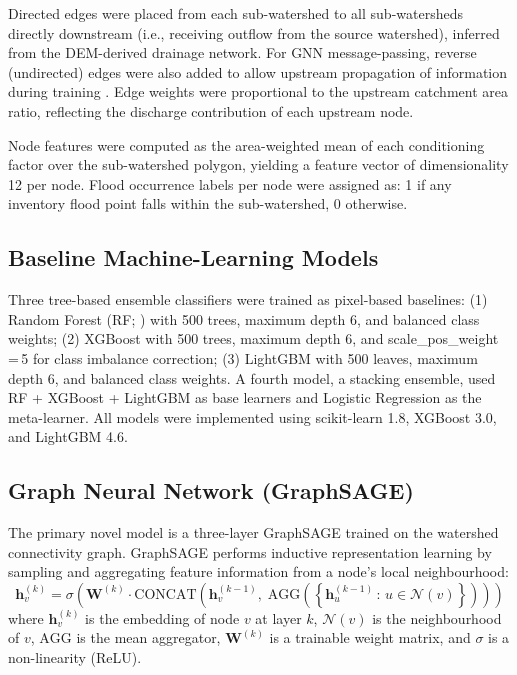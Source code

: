 Directed edges were placed from each sub-watershed to all sub-watersheds
directly downstream (i.e., receiving outflow from the source watershed),
inferred from the DEM-derived drainage network.
For GNN message-passing, reverse (undirected) edges were also added
to allow upstream propagation of information during training
\citep{hamilton2017graphsage}.
Edge weights were proportional to the upstream catchment area ratio,
reflecting the discharge contribution of each upstream node.

Node features were computed as the area-weighted mean of each conditioning factor
over the sub-watershed polygon, yielding a feature vector of dimensionality 12
per node.
Flood occurrence labels per node were assigned as: 1 if any inventory flood point
falls within the sub-watershed, 0 otherwise.

\subsection{Baseline Machine-Learning Models}
\label{sec:baselines}

Three tree-based ensemble classifiers were trained as pixel-based baselines:
(1) Random Forest (RF; \citealt{breiman2001rf}) with 500 trees, maximum depth 6,
and balanced class weights;
(2) XGBoost \citep{chen2016xgboost} with 500 trees, maximum depth 6,
and scale\_pos\_weight\,=\,5 for class imbalance correction;
(3) LightGBM \citep{ke2017lightgbm} with 500 leaves, maximum depth 6,
and balanced class weights.
A fourth model, a stacking ensemble, used RF + XGBoost + LightGBM as base learners
and Logistic Regression as the meta-learner.
All models were implemented using scikit-learn 1.8, XGBoost 3.0, and LightGBM 4.6.

\subsection{Graph Neural Network (GraphSAGE)}
\label{sec:gnn}

The primary novel model is a three-layer GraphSAGE
\citep{hamilton2017graphsage} trained on the watershed connectivity graph.
GraphSAGE performs inductive representation learning by sampling and aggregating
feature information from a node's local neighbourhood:
\begin{equation}
  \mathbf{h}_v^{(k)} = \sigma\!\left(
    \mathbf{W}^{(k)} \cdot
    \mathrm{CONCAT}\!\left(
      \mathbf{h}_v^{(k-1)},\;
      \mathrm{AGG}\!\left(\left\{\mathbf{h}_u^{(k-1)}\,:\,u \in \mathcal{N}(v)\right\}\right)
    \right)
  \right)
  \label{eq:graphsage}
\end{equation}
where $\mathbf{h}_v^{(k)}$ is the embedding of node $v$ at layer $k$,
$\mathcal{N}(v)$ is the neighbourhood of $v$,
$\mathrm{AGG}$ is the mean aggregator,
$\mathbf{W}^{(k)}$ is a trainable weight matrix,
and $\sigma$ is a non-linearity (ReLU).

